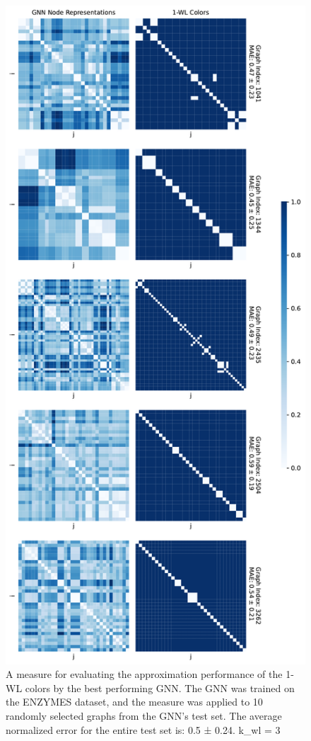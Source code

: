 \begin{figure}[!ht]
\begin{minipage}[b]{0.45992852703\textwidth}
    \end{minipage}
    \hfill
    \begin{minipage}[b]{0.53007147296\textwidth}
        \includegraphics[width=\textwidth, right]{Figures/heatmaps_NCI1_1.pdf}
    \end{minipage}
    \hfill
    \caption{A measure for evaluating the approximation performance of the 1-WL colors by the best performing GNN. The GNN was trained on the ENZYMES dataset, and the measure was applied to 10 randomly selected graphs from the GNN's test set. The average normalized error for the entire test set is: 0.5 ± 0.24. k\_wl = 3}
\end{figure}


